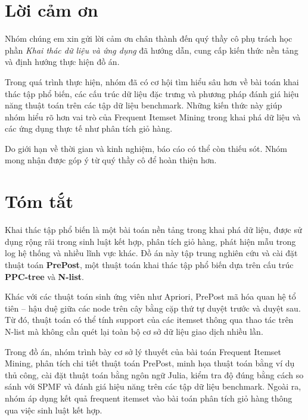 \documentclass[12pt,a4paper]{article}
\begin{document}
\section*{Lời cảm ơn}

Nhóm chúng em xin gửi lời cảm ơn chân thành đến quý thầy cô phụ trách học phần
\textit{Khai thác dữ liệu và ứng dụng} đã hướng dẫn, cung cấp kiến thức nền tảng
và định hướng thực hiện đồ án.

Trong quá trình thực hiện, nhóm đã có cơ hội tìm hiểu sâu hơn về bài toán khai thác
tập phổ biến, các cấu trúc dữ liệu đặc trưng và phương pháp đánh giá hiệu năng thuật
toán trên các tập dữ liệu benchmark. Những kiến thức này giúp nhóm hiểu rõ hơn vai
trò của Frequent Itemset Mining trong khai phá dữ liệu và các ứng dụng thực tế như
phân tích giỏ hàng.

Do giới hạn về thời gian và kinh nghiệm, báo cáo có thể còn thiếu sót. Nhóm mong
nhận được góp ý từ quý thầy cô để hoàn thiện hơn.

\newpage

\section*{Tóm tắt}

Khai thác tập phổ biến là một bài toán nền tảng trong khai phá dữ liệu, được sử dụng
rộng rãi trong sinh luật kết hợp, phân tích giỏ hàng, phát hiện mẫu trong log hệ thống
và nhiều lĩnh vực khác. Đồ án này tập trung nghiên cứu và cài đặt thuật toán
\textbf{PrePost}, một thuật toán khai thác tập phổ biến dựa trên cấu trúc
\textbf{PPC-tree} và \textbf{N-list}.

Khác với các thuật toán sinh ứng viên như Apriori, PrePost mã hóa quan hệ tổ tiên
-- hậu duệ giữa các node trên cây bằng cặp thứ tự duyệt trước và duyệt sau. Từ đó,
thuật toán có thể tính support của các itemset thông qua thao tác trên N-list mà không
cần quét lại toàn bộ cơ sở dữ liệu giao dịch nhiều lần.

Trong đồ án, nhóm trình bày cơ sở lý thuyết của bài toán Frequent Itemset Mining,
phân tích chi tiết thuật toán PrePost, minh họa thuật toán bằng ví dụ thủ công, cài đặt
thuật toán bằng ngôn ngữ Julia, kiểm tra độ đúng bằng cách so sánh với SPMF và đánh
giá hiệu năng trên các tập dữ liệu benchmark. Ngoài ra, nhóm áp dụng kết quả frequent
itemset vào bài toán phân tích giỏ hàng thông qua việc sinh luật kết hợp.
\end{document}
